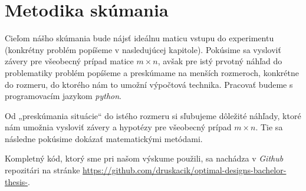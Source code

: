 \section{Metodika skúmania}

Cieľom nášho skúmania bude nájsť ideálnu maticu vstupu do experimentu (konkrétny problém popíšeme v nasledujúcej kapitole). 
Pokúsime sa vysloviť závery pre všeobecný prípad matice $m \times n$,
avšak pre istý prvotný náhľad do problematiky problém popíšeme a preskúmame na menších rozmeroch, 
konkrétne do rozmeru, do ktorého nám to umožní výpočtová technika. Pracovať budeme s programovacím jazykom \textit{python}.

Od „preskúmania situácie“ do istého rozmeru si sľubujeme dôležité náhľady, 
ktoré nám umožnia vysloviť závery a hypotézy pre všeobecný prípad $m \times n$. 
Tie sa následne pokúsime dokázať matematickými metódami.

Kompletný kód, ktorý sme pri našom výskume použili, sa nachádza v \emph{Github} repozitári na stránke
\url{https://github.com/druskacik/optimal-designs-bachelor-thesis-}.